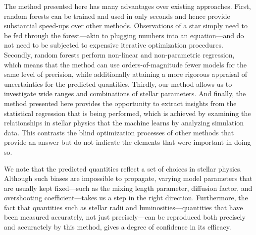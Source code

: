 \documentclass[manuscript,linenumbers]{aastex6}
\begin{document}
The method presented here has many advantages over existing approaches. First, random forests can be trained and used in only seconds and hence provide substantial speed-ups over other methods. Observations of a star simply need to be fed through the forest---akin to plugging numbers into an equation---and do not need to be subjected to expensive iterative optimization procedures. 
Secondly, random forests perform non-linear and non-parametric regression, which means that the method can use orders-of-magnitude fewer models for the same level of precision, while additionally attaining a more rigorous appraisal of uncertainties for the predicted quantities. 
Thirdly, our method allows us to investigate wide ranges and combinations of stellar parameters. %
And finally, the method presented here provides the opportunity to extract insights from the statistical regression that is being performed, which is achieved by examining the relationships in stellar physics that the machine learns by analyzing simulation data. This contrasts the blind optimization processes of other methods that provide an answer but do not indicate the elements that were important in doing so. 

We note that the predicted quantities reflect a set of choices in stellar physics. Although such biases are impossible to propagate, varying model parameters that are usually kept fixed---such as the mixing length parameter, diffusion factor, and overshooting coefficient---takes us a step in the right direction. Furthermore, the fact that quantities such as stellar radii and luminosities---quantities that have been measured accurately, not just precisely---can be reproduced both precisely and accuractely by this method, gives a degree of confidence in its efficacy. 
\end{document}
